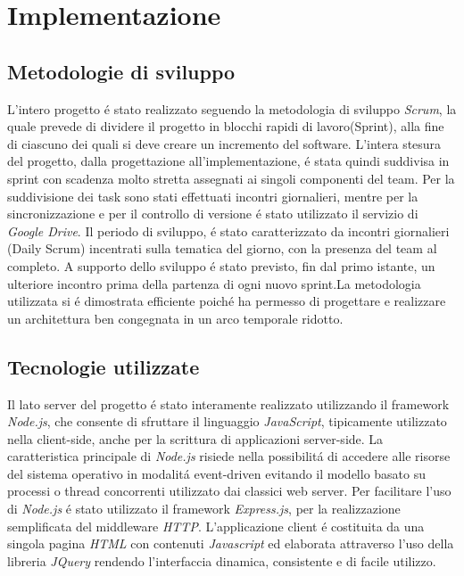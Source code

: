 \documentclass{sig-alternate-05-2015}
\begin{document}
\section{Implementazione}
\subsection{Metodologie di sviluppo}


L'intero progetto \'e stato realizzato seguendo la metodologia di sviluppo \textit{Scrum}, la quale prevede di dividere il progetto in blocchi rapidi di lavoro(Sprint), alla fine di ciascuno dei quali si deve creare un incremento del software. L'intera stesura del progetto, dalla progettazione all'implementazione, \'e stata quindi suddivisa in sprint con scadenza molto stretta assegnati ai singoli componenti del team. 
Per la suddivisione dei task sono stati effettuati incontri giornalieri, mentre per la sincronizzazione e per il controllo di versione \'e stato utilizzato il servizio di \textit{Google Drive}. Il periodo di sviluppo, \'e stato caratterizzato da incontri giornalieri (Daily Scrum) incentrati sulla tematica del giorno, con la presenza del team al completo. A supporto dello sviluppo \'e stato previsto, fin dal primo istante, un ulteriore incontro prima della partenza di ogni nuovo sprint.La metodologia utilizzata si \'e dimostrata efficiente poich\'e ha permesso di progettare e realizzare un architettura ben congegnata in un arco temporale ridotto.
\subsection{Tecnologie utilizzate}


Il lato server del progetto \'e stato interamente realizzato utilizzando il framework \textit{Node.js}, che consente di sfruttare il linguaggio \textit{JavaScript}, tipicamente utilizzato nella client-side, anche per la scrittura di applicazioni server-side. La caratteristica principale di \textit{Node.js} risiede nella possibilit\'a di accedere alle risorse del sistema operativo in modalit\'a event-driven evitando il modello basato su processi o thread concorrenti utilizzato dai classici web server. Per facilitare l'uso di \textit{Node.js} \'e stato utilizzato il framework \textit{Express.js}, per la realizzazione semplificata del middleware \textit{HTTP}.
 L'applicazione client \'e costituita da una singola pagina \textit{HTML} con contenuti \textit{Javascript} ed elaborata attraverso l'uso della libreria \textit{JQuery} rendendo l'interfaccia dinamica, consistente e di facile utilizzo. 
\end{document}

